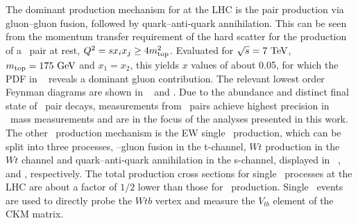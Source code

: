 The dominant production mechanism for  at the \gls{LHC} is the pair production via gluon--gluon fusion, followed by quark--anti-quark annihilation. This can be seen from the momentum transfer requirement of the hard scatter for the production of a \tquark\ pair at rest, $Q^2 = s x_{i} x_{j} \geq 4 m_{\mathrm{top}}^2$. Evaluated for ${\sqrt{s}}=7~\mathrm{TeV}$, $m_{\mathrm{top}}=175~\mathrm{GeV}$ and $x_1=x_2$, this yields $x$ values of about 0.05, for which the \gls{PDF} in \fig~ reveals a dominant gluon contribution. The relevant lowest order Feynman diagrams are shown in ~ and . Due to the abundance and distinct final state of \tquark\ pair decays, measurements from \tquark\ pairs achieve highest precision in \tquark\ mass measurements and are in the focus of the analyses presented in this work. 
%
The other \tquark\ production mechanism is the \gls{EW} single \tquark\ production, which can be split into three processes, \Wboson--gluon fusion in the t-channel, $Wt$ production in the $Wt$ channel and quark--anti-quark annihilation in the s-channel, displayed in ~,  and , respectively. The total production cross sections for single \tquark\ processes at the \gls{LHC} are about a factor of $1/2$ lower than those for \ttbar\ production. Single \tquark\ events are used to directly probe the $Wtb$ vertex and measure the $V_{tb}$ element of the \gls{CKM} matrix.
%
